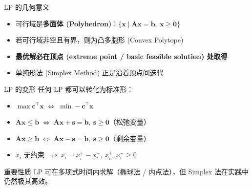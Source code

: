 \documentclass[11pt, aspectratio=169, svgnames, table, fontset=fandol]{ctexbeamer}
\begin{document}
\begin{frame}{LP 的几何意义}
  \begin{itemize}
    \item 可行域是\textbf{多面体 (Polyhedron)}：$\{\bm{x} \mid \bm{Ax} = \bm{b},\ \bm{x} \geq \bm{0}\}$
    \item 若可行域非空且有界，则为凸多胞形 (Convex Polytope)
    \item \textbf{最优解必在顶点 (extreme point / basic feasible solution) 处取得}
    \item 单纯形法 (Simplex Method) 正是沿着顶点间迭代
  \end{itemize}
  \vspace{10pt}
  \begin{center}
  \end{center}
\end{frame}

\begin{frame}{LP 的变形}
  任何 LP 都可以转化为标准形：
  \begin{itemize}
    \item $\max \bm{c}^\top \bm{x} \;\Longleftrightarrow\; \min -\bm{c}^\top \bm{x}$
    \item $\bm{Ax} \leq \bm{b} \;\Longleftrightarrow\; \bm{Ax} + \bm{s} = \bm{b},\ \bm{s} \geq \bm{0}$（松弛变量）
    \item $\bm{Ax} \geq \bm{b} \;\Longleftrightarrow\; \bm{Ax} - \bm{s} = \bm{b},\ \bm{s} \geq \bm{0}$（剩余变量）
    \item $x_i$ 无约束 $\;\Longleftrightarrow\; x_i = x_i^+ - x_i^-,\ x_i^+, x_i^- \geq 0$
  \end{itemize}
  \vspace{8pt}
  \begin{alertblock}{重要性质}
    LP 可在多项式时间内求解（椭球法 / 内点法），但 Simplex 法在实践中仍然极其高效。
  \end{alertblock}
\end{frame}
\end{document}
